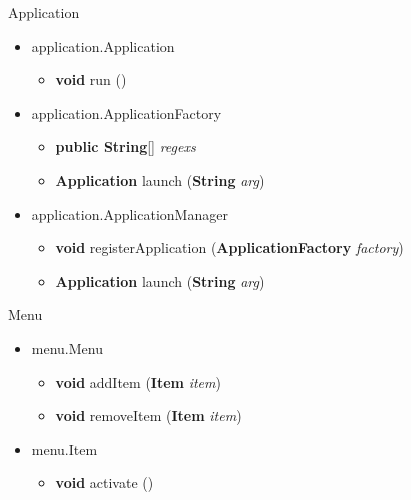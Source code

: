 \documentclass[style=smrt,mode=present,paper=screen]{powerdot}
\begin{document}
\begin{slide}{Application}
\begin{itemize}
\item application.Application
\begin{itemize}
	\item \textbf{void} run ()
\end{itemize}
\item application.ApplicationFactory
\begin{itemize}
	\item \textbf{public String}[] \textit{regexs}
	\item \textbf{Application} launch (\textbf{String} \textit{arg})
\end{itemize}
\item application.ApplicationManager
\begin{itemize}
\item \textbf{void} registerApplication (\textbf{ApplicationFactory} \textit{factory})
\item \textbf{Application} launch (\textbf{String} \textit{arg})
\end{itemize}
\end{itemize}
\end{slide}

\begin{slide}{Menu}
\begin{itemize}
\item menu.Menu
\begin{itemize}
	\item \textbf{void} addItem (\textbf{Item} \textit{item})
	\item \textbf{void} removeItem (\textbf{Item} \textit{item})
\end{itemize}
\item menu.Item
\begin{itemize}
	\item \textbf{void} activate ()
\end{itemize}
\end{itemize}
\end{slide}
\end{document}
